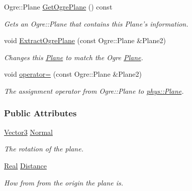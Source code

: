 \begin{DoxyCompactItemize}
Ogre::Plane \hyperlink{classphys_1_1Plane_abbdcdd8d6e7c0d8de92cabd250ff41dc}{GetOgrePlane} () const 
\begin{DoxyCompactList}\small\item\em Gets an Ogre::Plane that contains this Plane's information. \item\end{DoxyCompactList}\item 
void \hyperlink{classphys_1_1Plane_a84b2378666a0e1c791f4f72d8df52c84}{ExtractOgrePlane} (const Ogre::Plane \&Plane2)
\begin{DoxyCompactList}\small\item\em Changes this \hyperlink{classphys_1_1Plane}{Plane} to match the Ogre \hyperlink{classphys_1_1Plane}{Plane}. \item\end{DoxyCompactList}\item 
void \hyperlink{classphys_1_1Plane_ac045b7b0aac024a5fe771786d0c433f7}{operator=} (const Ogre::Plane \&Plane2)
\begin{DoxyCompactList}\small\item\em The assignment operator from Ogre::Plane to \hyperlink{classphys_1_1Plane}{phys::Plane}. \item\end{DoxyCompactList}\end{DoxyCompactItemize}
\subsubsection*{Public Attributes}
\begin{DoxyCompactItemize}
\item 
\hypertarget{classphys_1_1Plane_ac54624aabcdede3d45e06dd869419c9f}{
\hyperlink{classphys_1_1Vector3}{Vector3} \hyperlink{classphys_1_1Plane_ac54624aabcdede3d45e06dd869419c9f}{Normal}}
\label{classphys_1_1Plane_ac54624aabcdede3d45e06dd869419c9f}

\begin{DoxyCompactList}\small\item\em The rotation of the plane. \item\end{DoxyCompactList}\item 
\hypertarget{classphys_1_1Plane_ac352595324c4df7f8385c3ad7014e65c}{
\hyperlink{namespacephys_af7eb897198d265b8e868f45240230d5f}{Real} \hyperlink{classphys_1_1Plane_ac352595324c4df7f8385c3ad7014e65c}{Distance}}
\label{classphys_1_1Plane_ac352595324c4df7f8385c3ad7014e65c}

\begin{DoxyCompactList}\small\item\em How from from the origin the plane is. \item\end{DoxyCompactList}\end{DoxyCompactItemize}


